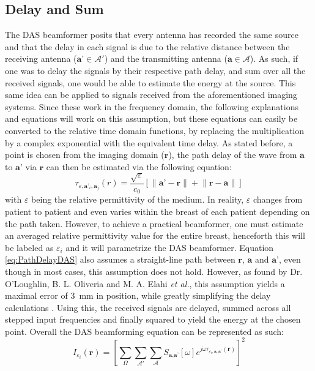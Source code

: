 \subsection{Delay and Sum}
The DAS beamformer posits that every antenna has recorded the same source and that the delay in each signal is due to
the relative distance between the receiving antenna ($\textbf{a'} \in \mathcal{A}'$) and the transmitting antenna
($\textbf{a} \in \mathcal{A}$). As such, if one was to delay the signals by their respective path delay, and sum over
all the received signals, one would be able to estimate the energy at the source. This same idea can be applied to
signals received from the aforementioned imaging systems. Since these work in the frequency domain, the following
explanations and equations will work on this assumption, but these equations can easily be converted to the relative
time domain functions, by replacing the multiplication by a complex exponential with the equivalent time delay. As
stated before, a point is chosen from the imaging domain ($\textbf{r}$), the path delay of the wave from $\textbf{a}$ to
$\textbf{a'}$ via $\textbf{r}$ can then be estimated via the following equation:
\begingroup
\large
\begin{equation}
    \tau_{\varepsilon, \textbf{a'}_i, \textbf{a}_j}(r) = \frac{\sqrt{\varepsilon}}{c_0} \left [\lVert \textbf{a'} - \textbf{r} \rVert + \lVert \textbf{r} - \textbf{a}\rVert\right ]
    \label{eq:PathDelayDAS}
\end{equation}
\endgroup
with $\varepsilon$ being the relative permittivity of the medium. In reality, $\varepsilon$ changes from patient to patient
and even varies within the breast of each patient depending on the path taken. However, to achieve a practical
beamformer, one must estimate an averaged relative permittivity value for the entire breast, henceforth this will be
labeled as $\varepsilon_i$ and it will parametrize the DAS beamformer. Equation \ref{eq:PathDelayDAS} also assumes a
straight-line path between $\textbf{r}$, $\textbf{a}$ and $\textbf{a'}$, even though in most cases, this assumption does not
hold. However, as found by Dr. O'Loughlin, B. L. Oliveria and M. A. Elahi \textit{et al.}, this assumption yields a maximal error
of $3$~mm in position, while greatly simplifying the delay calculations \cite{oloughlinParameterSearchAlgorithms2017}.
Using this, the received signals are delayed, summed across all stepped input frequencies and finally squared to yield
the energy at the chosen point. Overall the DAS beamforming equation can be represented as such:
\begingroup
\large
\begin{equation}
    I_{\varepsilon_i}(\textbf{r}) = \left [\sum_{\Omega}\sum_{\mathcal{A}'}\sum_{\mathcal{A}} S_{\textbf{a}, \textbf{a'}}[\omega]e^{j\omega \tau_{\varepsilon_i, \textbf{a}, \textbf{a'}}(\textbf{r})}\right ]^2
    \label{eq:DASBeamformer}
\end{equation}
\endgroup

